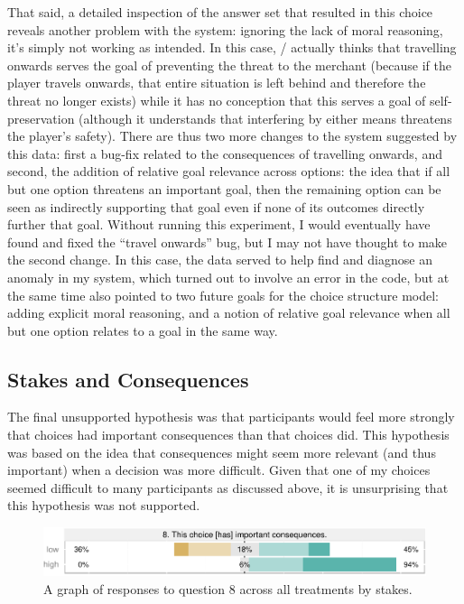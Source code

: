 That said, a detailed inspection of the answer set that resulted in this choice reveals another problem with the system: ignoring the lack of moral reasoning, it's simply not working as intended.
%
In this case, \dunyazad/ actually thinks that travelling onwards serves the goal of preventing the threat to the merchant (because if the player travels onwards, that entire situation is left behind and therefore the threat no longer exists) while it has no conception that this serves a goal of self-preservation (although it understands that interfering by either means threatens the player's safety).
%
There are thus two more changes to the system suggested by this data: first a bug-fix related to the consequences of travelling onwards, and second, the addition of relative goal relevance across options: the idea that if all but one option threatens an important goal, then the remaining option can be seen as indirectly supporting that goal even if none of its outcomes directly further that goal.
%
Without running this experiment, I would eventually have found and fixed the ``travel onwards'' bug, but I may not have thought to make the second change.
%
In this case, the data served to help find and diagnose an anomaly in my system, which turned out to involve an error in the code, but at the same time also pointed to two future goals for the choice structure model: adding explicit moral reasoning, and a notion of relative goal relevance when all but one option relates to a goal in the same way.


\subsection{Stakes and Consequences}

The final unsupported hypothesis was that participants would feel more strongly that \dlm{} choices had important consequences than that \obv{} choices did.
%
This hypothesis was based on the idea that consequences might seem more relevant (and thus important) when a decision was more difficult.
%
Given that one of my \obv{} choices seemed difficult to many participants as discussed above, it is unsurprising that this hypothesis was not supported.


\begin{figure}[!h]
  \includegraphics[width=\textwidth]{fig/stakes-q8.pdf}
  \caption[Prospective consequences results by stakes]{A graph of responses to question 8 across all treatments by stakes.}
  \label{fig:e1-stakesq8}
\end{figure}


